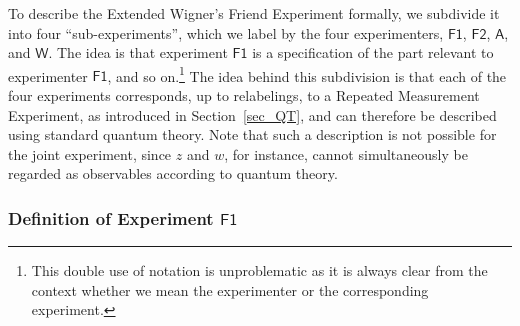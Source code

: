 \documentclass[12pt]{article}
\theoremstyle{plain}
\theoremstyle{definition}
\newcommand*{\Friendone}{\mathsf{F1}}
\newcommand*{\Friendtwo}{\mathsf{F2}}
\newcommand*{\Assistant}{\mathsf{A}}
\newcommand*{\Wigner}{\mathsf{W}}
\begin{document}
To describe the Extended Wigner's Friend Experiment formally, we subdivide it into four ``sub-experiments'', which we label by the four experimenters,  $\Friendone$, $\Friendtwo$, $\Assistant$, and $\Wigner$. The idea is that experiment $\Friendone$ is a specification of the part relevant to experimenter $\Friendone$, and so on.\footnote{This double use of notation is unproblematic as it is always clear from the context whether we mean the experimenter or the corresponding experiment.} The  idea behind this subdivision is that each of the four experiments corresponds, up to relabelings, to a Repeated Measurement Experiment, as introduced in Section~\ref{sec_QT}, and can therefore be described using standard quantum theory. Note that such a description is not possible for the joint experiment, since $z$ and $w$, for instance, cannot  simultaneously be regarded as observables according to quantum theory.

\subsubsection*{Definition of Experiment $\Friendone$}
\end{document}
